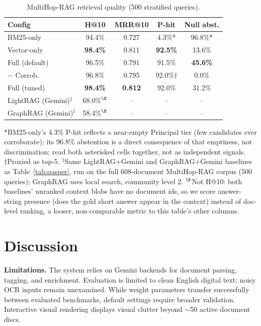 \documentclass[conference,a4paper]{IEEEtran}
\begin{document}
\begin{table}[t]
\centering
\caption{MultiHop-RAG retrieval quality (500 stratified queries).}
\label{tab:multihop}
\scriptsize
\setlength{\tabcolsep}{3pt}
\begin{tabular}{lcccc}
\toprule
Config & H@10 & MRR@10 & P-hit & Null abst. \\
\midrule
BM25-only & 94.4\% & 0.727 & 4.3\%* & 96.8\%* \\
Vector-only & \textbf{98.4\%} & 0.811 & \textbf{92.5\%} & 13.6\% \\
Full (default) & 96.5\% & 0.791 & 91.5\% & \textbf{45.6\%} \\
$-$ Corrob. & 96.8\% & 0.795 & 92.0\%† & 0.0\% \\
Full (tuned) & \textbf{98.4\%} & \textbf{0.812} & 92.0\% & 31.2\% \\
LightRAG (Gemini)$^\ddagger$ & 68.0\%$^\S$ & -- & -- & -- \\
GraphRAG (Gemini)$^\ddagger$ & 58.4\%$^\S$ & -- & -- & -- \\
\bottomrule
\end{tabular}
\vspace{2pt}
\footnotesize{*BM25-only's 4.3\% P-hit reflects a near-empty Principal tier (few candidates ever corroborate); its 96.8\% abstention is a direct consequence of that emptiness, not discrimination; read both asterisked cells together, not as independent signals. †Proxied as top-5. $^\ddagger$Same LightRAG+Gemini and GraphRAG+Gemini baselines as Table~\ref{tab:qasper}, run on the full 608-document MultiHop-RAG corpus (500 queries); GraphRAG uses local search, community level 2. $^\S$Not H@10: both baselines' unranked context blobs have no document ids, so we score answer-string presence (does the gold short answer appear in the context) instead of doc-level ranking, a looser, non-comparable metric to this table's other columns.}
\end{table}

\section{Discussion}

\textbf{Limitations.} The system relies on Gemini backends for document parsing, tagging, and enrichment. Evaluation is limited to clean English digital text; noisy OCR inputs remain unexamined. While weight parameters transfer successfully between evaluated benchmarks, default settings require broader validation. Interactive visual rendering displays visual clutter beyond $\sim$50 active document discs.
\end{document}
